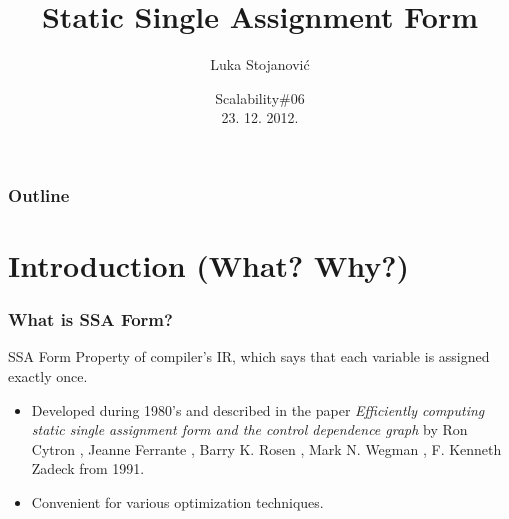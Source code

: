 \documentclass{beamer}
\title{Static Single Assignment Form}
\author{Luka Stojanović}
\institute{
  luka@magrathea.rs \\
  Seven Bridges Genomics
}
\date{Scalability\#06 \\ 23. 12. 2012.}
\begin{document}
  \begin{frame}
    \titlepage
  \end{frame}
  
  \begin{frame}
    \frametitle{Outline}
    \tableofcontents
  \end{frame}
  
  \section{Introduction (What? Why?)}
  \begin{frame}
    \frametitle{What is SSA Form?}
    \begin{block}{SSA Form}
    	Property of compiler's IR, which says that each variable is assigned exactly once.
    \end{block}
    
    \begin{itemize}
    	\item Developed during 1980's and described in the paper
    \emph{Efficiently computing static single assignment form and the control dependence graph}
    by Ron Cytron , Jeanne Ferrante , Barry K. Rosen , Mark N. Wegman , F. Kenneth Zadeck from 1991.
    	\item Convenient for various optimization techniques.
    \end{itemize}
    
  \end{frame}
  
\end{document}
